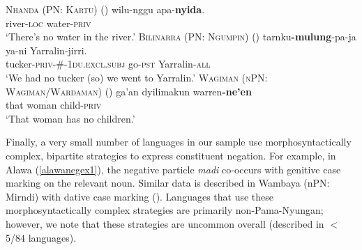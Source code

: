 \documentclass[12pt,egregdoesnotlikesansseriftitles]{scrartcl}
\begin{document}
\begin{exe}
  \ex \textsc{Nhanda (PN: Kartu)} \hfill (\citealt[64]{blevins01}) \label{privexist1}
  \gll wilu-nggu apa-\textbf{nyida}.\\
  river-\textsc{loc} water-\textsc{priv}\\
  \glt `There's no water in the river.'
 \ex\label{privexist2}\textsc{Bilinarra (PN: Ngumpin)} \hfill (\citealt[122]{nordlinger90})
 \gll tarnku\textbf{-mulung}-pa-ja ya-ni Yarralin-jirri.\\
 tucker\textsc{-priv-\#-1du.excl.subj} go\textsc{-pst} Yarralin\textsc{-all}\\
`We had no tucker (so) we went to Yarralin.'
\ex \textsc{Wagiman (nPN: Wagiman/Wardaman)} \hfill (\citealt[150]{wilson06})
\gll ga'an dyilimakun warren\textbf{-ne'en} \\ %
that woman child\textsc{-priv}\\
`That woman has no children.'
\label{privexist3}
 \end{exe}
 
 Finally, a very small number of languages in our sample use morphosyntactically complex, bipartite strategies to express constituent negation. For example, in Alawa (\ref{alawanegex1}),  the negative particle \textit{madi} co-occurs with genitive case marking on the relevant noun. Similar data is described in Wambaya (nPN: Mirndi) with dative case marking (\citealt[204]{nordlinger98}). Languages that use these morphosyntactically complex strategies are primarily non-Pama-Nyungan; however, we note that these strategies are uncommon overall (described in $<$5/84 languages).
 
\end{document}
